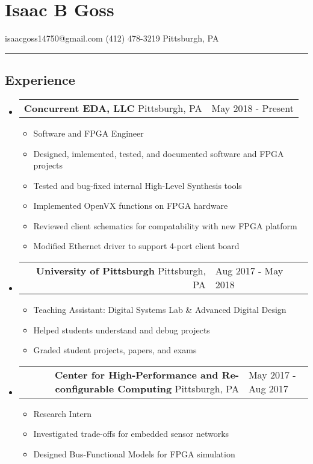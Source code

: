 \documentclass[18pt]{article}
\makeatletter
\providecommand{\tightlist}{
    \setlength{\itemsep}{0pt}\setlength{\parskip}{0pt}
}
\providecommand{\datetable}[2]{
    \begin{tabular*}{\textwidth}{@{}r @{\extracolsep{\fill}} l}
        #1 & #2
    \end{tabular*}
}
\makeatother
\begin{document}
    \section*{Isaac B Goss}\label{isaac-b-goss}
    isaacgoss14750@gmail.com \textbar{} (412) 478-3219 \textbar{} Pittsburgh, PA
    
    \hrule

    \subsection*{Experience}\label{experience}
    \begin{itemize}[label={}]

        \item \datetable{
            \textbf{Concurrent EDA, LLC} \textbar{} Pittsburgh, PA
        }{May 2018 - Present}
        \begin{itemize}[topsep=0pt]\tightlist
            \item Software and FPGA Engineer
            \item Designed, imlemented, tested, and documented software and FPGA projects
            \item Tested and bug-fixed internal High-Level Synthesis tools
            \item Implemented OpenVX functions on FPGA hardware
            \item Reviewed client schematics for compatability with new FPGA platform
            \item Modified Ethernet driver to support 4-port client board
        \end{itemize}

        \item \datetable{
            \textbf{University of Pittsburgh} \textbar{} Pittsburgh, PA
        }{Aug 2017 - May 2018}
        \begin{itemize}[topsep=0pt]\tightlist
            \item Teaching Assistant: Digital Systems Lab \& Advanced Digital Design
            \item Helped students understand and debug projects
            \item Graded student projects, papers, and exams
        \end{itemize}

        \item \datetable{
            \textbf{Center for High-Performance and Re-configurable Computing} \textbar{} Pittsburgh, PA
        }{May 2017 - Aug 2017}
        \begin{itemize}[topsep=0pt]\tightlist
            \item Research Intern
            \item Investigated trade-offs for embedded sensor networks
            \item Designed Bus-Functional Models for FPGA simulation
      	\end{itemize}

    \end{itemize}
\end{document}
